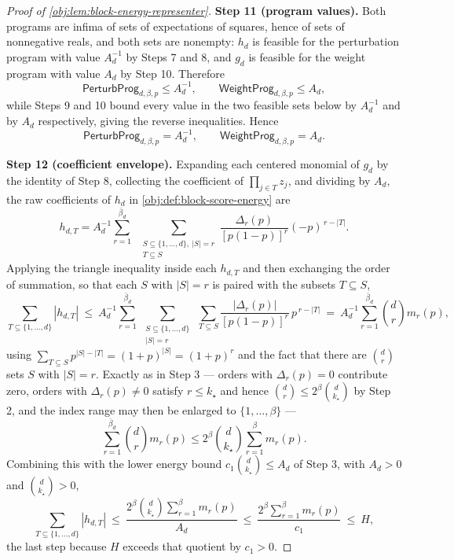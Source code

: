 \begin{proof}[Proof of \cref{obj:lem:block-energy-representer}]
\textbf{Step 11 (program values).}
Both programs are infima of sets of expectations of squares, hence of sets of nonnegative reals, and both sets are nonempty: \(h_d\) is feasible for the perturbation program with value \(A_d^{-1}\) by Steps 7 and 8, and \(g_d\) is feasible for the weight program with value \(A_d\) by Step 10.  Therefore
\[
\mathsf{PerturbProg}_{d,\beta,p}\le A_d^{-1},
\qquad
\mathsf{WeightProg}_{d,\beta,p}\le A_d ,
\]
while Steps 9 and 10 bound every value in the two feasible sets below by \(A_d^{-1}\) and by \(A_d\) respectively, giving the reverse inequalities.  Hence
\[
\mathsf{PerturbProg}_{d,\beta,p}=A_d^{-1},
\qquad
\mathsf{WeightProg}_{d,\beta,p}=A_d .
\]

\textbf{Step 12 (coefficient envelope).}
Expanding each centered monomial of \(g_d\) by the identity of Step 8, collecting the coefficient of \(\prod_{j\in T}z_j\), and dividing by \(A_d\), the raw coefficients of \(h_d\) in \cref{obj:def:block-score-energy} are
\[
h_{d,T}
=A_d^{-1}\sum_{r=1}^{\bar\beta_d}\ \
\sum_{\substack{S\subseteq\{1,\ldots,d\},\ |S|=r\\ T\subseteq S}}
\frac{\Delta_r(p)}{[p(1-p)]^r}(-p)^{\,r-|T|}.
\]
Applying the triangle inequality inside each \(h_{d,T}\) and then exchanging the order of summation, so that each \(S\) with \(|S|=r\) is paired with the subsets \(T\subseteq S\),
\[
\sum_{T\subseteq\{1,\ldots,d\}}|h_{d,T}|
\ \le\
A_d^{-1}\sum_{r=1}^{\bar\beta_d}\ \sum_{\substack{S\subseteq\{1,\ldots,d\}\\ |S|=r}}\ \sum_{T\subseteq S}\frac{|\Delta_r(p)|}{[p(1-p)]^r}\,p^{\,r-|T|}
\ =\
A_d^{-1}\sum_{r=1}^{\bar\beta_d}\binom d r m_r(p),
\]
using \(\sum_{T\subseteq S}p^{|S|-|T|}=(1+p)^{|S|}=(1+p)^r\) and the fact that there are \(\binom d r\) sets \(S\) with \(|S|=r\). %
Exactly as in Step 3 — orders with \(\Delta_r(p)=0\) contribute zero, orders with \(\Delta_r(p)\ne0\) satisfy \(r\le k_\star\) and hence \(\binom d r\le2^\beta\binom{d}{k_\star}\) by Step 2, and the index range may then be enlarged to \(\{1,\ldots,\beta\}\) —
\[
\sum_{r=1}^{\bar\beta_d}\binom d r m_r(p)\le 2^\beta\binom{d}{k_\star}\sum_{r=1}^{\beta}m_r(p).
\]
Combining this with the lower energy bound \(c_1\binom{d}{k_\star}\le A_d\) of Step 3, with \(A_d>0\) and \(\binom{d}{k_\star}>0\),
\[
\sum_{T\subseteq\{1,\ldots,d\}}|h_{d,T}|
\ \le\
\frac{2^\beta\binom{d}{k_\star}\sum_{r=1}^{\beta}m_r(p)}{A_d}
\ \le\
\frac{2^\beta\sum_{r=1}^{\beta}m_r(p)}{c_1}
\ \le\ H,
\]
the last step because \(H\) exceeds that quotient by \(c_1>0\). %
\end{proof}
